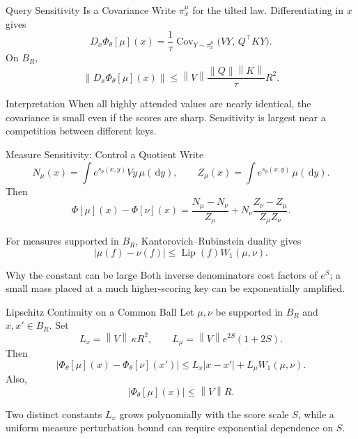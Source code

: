 \documentclass[aspectratio=169,11pt]{beamer}
\newcommand{\dd}{\,\mathrm{d}}
\newcommand{\abs}[1]{\left\lvert#1\right\rvert}
\newcommand{\norm}[1]{\left\lVert#1\right\rVert}
\begin{document}
\begin{frame}{Query Sensitivity Is a Covariance}
Write $\pi_x^\mu$ for the tilted law.  Differentiating in $x$ gives
\[
 D_x\Phi_\theta[\mu](x)
 =\frac1\tau
 \operatorname{Cov}_{Y\sim\pi_x^\mu}
 \bigl(VY,\,Q^\top KY\bigr).
\]
On $B_R$,
\[
 \norm{D_x\Phi_\theta[\mu](x)}
 \le \norm V\frac{\norm Q\norm K}{\tau}R^2.
\]

\begin{exampleblock}{Interpretation}
When all highly attended values are nearly identical, the covariance is small even if the scores are sharp.  Sensitivity is largest near a competition between different keys.
\end{exampleblock}
\end{frame}

\begin{frame}{Measure Sensitivity: Control a Quotient}
Write
\[
 N_\mu(x)=\int e^{s_\theta(x,y)}Vy\,\mu(\dd y),
 \qquad
 Z_\mu(x)=\int e^{s_\theta(x,y)}\,\mu(\dd y).
\]
Then
\[
 \Phi[\mu](x)-\Phi[\nu](x)
 =\frac{N_\mu-N_\nu}{Z_\mu}
 +N_\nu\frac{Z_\nu-Z_\mu}{Z_\mu Z_\nu}.
\]

For measures supported in $B_R$, Kantorovich--Rubinstein duality gives
\[
 \abs{\mu(f)-\nu(f)}\le \operatorname{Lip}(f)W_1(\mu,\nu).
\]

\begin{alertblock}{Why the constant can be large}
Both inverse denominators cost factors of $e^S$; a small mass placed at a much higher-scoring key can be exponentially amplified.
\end{alertblock}
\end{frame}

\begin{frame}{Lipschitz Continuity on a Common Ball}
Let $\mu,\nu$ be supported in $B_R$ and $x,x'\in B_R$.  Set
\[
 L_x=\norm V\,\kappa R^2,
 \qquad
 L_\mu=\norm V e^{2S}(1+2S).
\]
Then
\[
 \boxed{
 \abs{\Phi_\theta[\mu](x)-\Phi_\theta[\nu](x')}
 \le L_x\abs{x-x'}+L_\mu W_1(\mu,\nu).}
\]
Also,
\[
 \abs{\Phi_\theta[\mu](x)}\le \norm V R.
\]

\begin{block}{Two distinct constants}
$L_x$ grows polynomially with the score scale $S$, while a uniform measure perturbation bound can require exponential dependence on $S$.
\end{block}
\end{frame}
\end{document}
